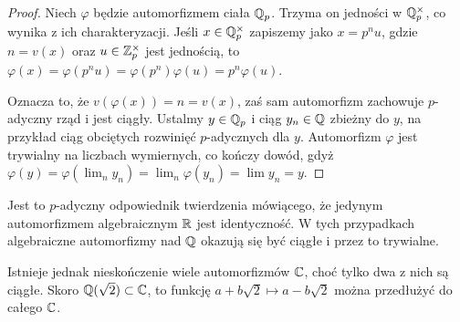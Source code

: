 \begin{proof}
	Niech $\varphi$ będzie automorfizmem ciała $\mathbb Q_p$.
	Trzyma on jedności w $\mathbb Q_p^\times$, co wynika z ich charakteryzacji.
	Jeśli $x \in \mathbb Q_p^\times$ zapiszemy jako $x = p^nu$, gdzie $n = v(x)$ oraz $u \in \mathbb Z_p^\times$ jest jednością, to $\varphi(x) = \varphi(p^nu) = \varphi(p^n) \varphi(u) = p^n\varphi(u)$.

	Oznacza to, że $v(\varphi(x)) = n = v(x)$, zaś sam automorfizm zachowuje $p$-adyczny rząd i jest ciągły.
	Ustalmy $y \in \mathbb Q_p$ i ciąg $y_n \in \mathbb Q$ zbieżny do $y$, na przykład ciąg obciętych rozwinięć $p$-adycznych dla $y$.
	Automorfizm $\varphi$ jest trywialny na liczbach wymiernych, co kończy dowód, gdyż $\varphi(y) = \varphi(\lim_n y_n) = \lim_n \varphi(y_n) = \lim y_n = y$.
\end{proof}

Jest to $p$-adyczny odpowiednik twierdzenia mówiącego, że jedynym automorfizmem algebraicznym  $\mathbb R$ jest identyczność.
W tych przypadkach algebraiczne automorfizmy nad $\mathbb Q$ okazują się być ciągłe i przez to trywialne.

Istnieje jednak nieskończenie wiele automorfizmów $\mathbb C$, choć tylko dwa z nich są ciągłe.
Skoro $\mathbb Q(\sqrt 2) \subset \mathbb C$, to funkcję $a + b\sqrt 2 \mapsto a - b\sqrt 2$ można przedłużyć do całego $\mathbb C$.
